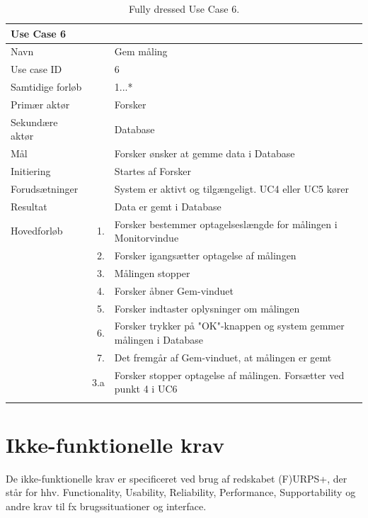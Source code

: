 \begin{longtabu} to  %
    {\large \textbf{Use Case 6}} && \\
    \toprule
    Navn &&    Gem måling\\
    Use case ID &&    6\\
    Samtidige forløb &&   1...*\\
    Primær aktør &&    Forsker\\
    Sekundære aktør &&	Database\\
    Mål &&    Forsker ønsker at gemme data i Database\\
    Initiering &&	Startes af Forsker\\
    Forudsætninger &&  System er aktivt og tilgængeligt. UC4 eller UC5 kører  \\
    Resultat &&		Data er gemt i Database                 \\ \midrule
    Hovedforløb &    1. &    Forsker bestemmer optagelseslængde for målingen i Monitorvindue \\[-1ex] 
  						 
                &    2. &    Forsker igangsætter optagelse af målingen 		 \\[-1ex] 
                &    3.	&	 Målingen stopper\\
                &	 4.	&	 Forsker åbner Gem-vinduet\\[-1ex]			 
                &	 5. &	 Forsker indtaster oplysninger om målingen \\[-1ex]
                &	 6. &	 Forsker trykker på "OK"\--knappen og system gemmer målingen i Database				 \\[-1ex]
                &	 7.	&	 Det fremgår af 	Gem-vinduet, at målingen 		 er gemt\newline\\ \midrule
                
      			&    3.a &   Forsker stopper optagelse af målingen. Forsætter ved punkt 4 i UC6  \\
\bottomrule
    
\caption{Fully dressed Use Case 6.}
\label{UC6}
\end{longtabu}

\section{Ikke-funktionelle krav}
De ikke-funktionelle krav er specificeret ved brug af redskabet (F)URPS+, der står for hhv. Functionality, Usability, Reliability, Performance, Supportability og andre krav til fx brugssituationer og interface.  


